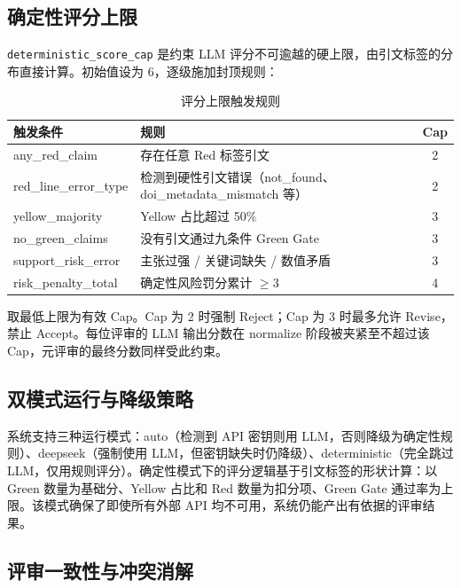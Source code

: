 \documentclass[11pt,a4paper]{ctexart}
\begin{document}
\subsection{确定性评分上限}

\texttt{deterministic\_score\_cap} 是约束 LLM 评分不可逾越的硬上限，由引文标签的分布直接计算。初始值设为 6，逐级施加封顶规则：

\begin{table}[htbp]
\centering
\caption{评分上限触发规则}
\begin{tabularx}{\textwidth}{@{}>{\ttfamily}l>{\raggedright\arraybackslash}Xc@{}}
\toprule
\textbf{触发条件} & \textbf{规则} & \textbf{Cap} \\
\midrule
any\_red\_claim          & 存在任意 Red 标签引文                                  & 2 \\
red\_line\_error\_type   & 检测到硬性引文错误（not\_found、doi\_metadata\_mismatch 等） & 2 \\
yellow\_majority         & Yellow 占比超过 50\%                                   & 3 \\
no\_green\_claims        & 没有引文通过九条件 Green Gate                            & 3 \\
support\_risk\_error     & 主张过强 / 关键词缺失 / 数值矛盾                          & 3 \\
risk\_penalty\_total     & 确定性风险罚分累计 $\ge 3$                                & 4 \\
\bottomrule
\end{tabularx}
\end{table}

取最低上限为有效 Cap。Cap 为 2 时强制 Reject；Cap 为 3 时最多允许 Revise，禁止 Accept。每位评审的 LLM 输出分数在 normalize 阶段被夹紧至不超过该 Cap，元评审的最终分数同样受此约束。

\subsection{双模式运行与降级策略}

系统支持三种运行模式：auto（检测到 API 密钥则用 LLM，否则降级为确定性规则）、deepseek（强制使用 LLM，但密钥缺失时仍降级）、deterministic（完全跳过 LLM，仅用规则评分）。确定性模式下的评分逻辑基于引文标签的形状计算：以 Green 数量为基础分、Yellow 占比和 Red 数量为扣分项、Green Gate 通过率为上限。该模式确保了即使所有外部 API 均不可用，系统仍能产出有依据的评审结果。

\subsection{评审一致性与冲突消解}
\end{document}
